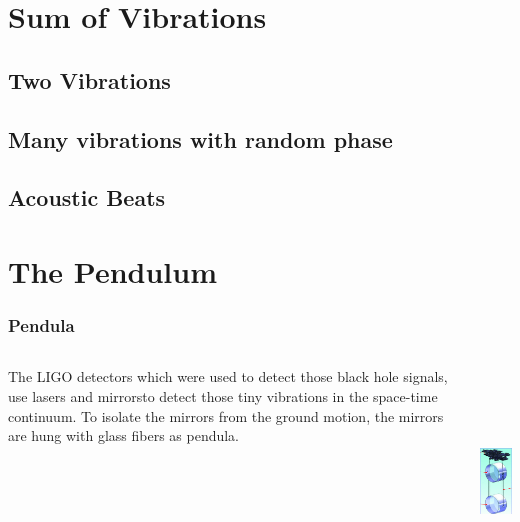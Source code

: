 \documentclass[pdf,hideothersubsections]{beamer}
\begin{document}

\section{Sum of Vibrations}
\subsection{Two Vibrations}

\subsection{Many vibrations with random phase}

\subsection{Acoustic Beats}


\section{The Pendulum}
\begin{frame}
\frametitle{Pendula}

\begin{columns}[T]
   \begin{column}{0.5\textwidth}
    The LIGO detectors which were used to detect those black hole signals, use lasers and mirrors\footnotemark to detect those tiny vibrations in the space-time continuum. To isolate the mirrors from the ground motion, the mirrors are hung with 
glass fibers as pendula\footnotemark.

   \end{column}

   \pause
   \begin{column}{0.5\textwidth}
   \includegraphics[height=6cm]{LIGO-Pendulum-diagram.png}      

   \end{column}
  
\end{columns}

\end{frame}
\end{document}
